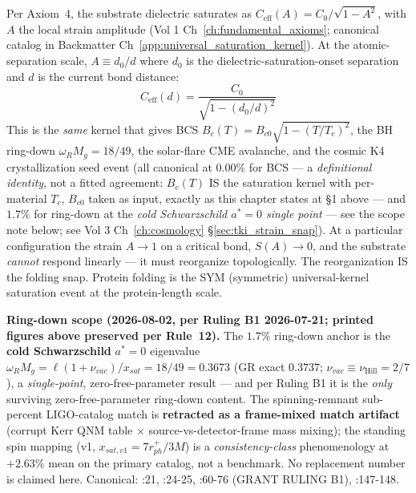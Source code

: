Per Axiom~4, the substrate dielectric saturates as $C_{\text{eff}}(A) = C_0 / \sqrt{1 - A^2}$, with $A$ the local strain amplitude (Vol 1 Ch~\ref{ch:fundamental_axioms}; canonical catalog in Backmatter Ch~\ref{app:universal_saturation_kernel}). At the atomic-separation scale, $A \equiv d_0/d$ where $d_0$ is the dielectric-saturation-onset separation and $d$ is the current bond distance:
\begin{equation}
    C_{\text{eff}}(d) = \frac{C_0}{\sqrt{1 - (d_0/d)^2}}
    \label{eq:protein_saturation_kernel}
\end{equation}
This is the \emph{same} kernel that gives BCS $B_c(T) = B_{c0}\sqrt{1-(T/T_c)^2}$, the BH ring-down $\omega_R M_g = 18/49$, the solar-flare CME avalanche, and the cosmic K4 crystallization seed event (all canonical at $0.00\%$ for BCS --- a \emph{definitional identity}, not a fitted agreement: $B_c(T)$ IS the saturation kernel with per-material $T_c$, $B_{c0}$ taken as input, exactly as this chapter states at \S1 above --- and $1.7\%$ for ring-down at the \emph{cold Schwarzschild $a^{*} = 0$ single point} --- see the scope note below; see Vol 3 Ch~\ref{ch:cosmology} \S\ref{sec:tki_strain_snap}). At a particular configuration the strain $A \to 1$ on a critical bond, $S(A) \to 0$, and the substrate \emph{cannot} respond linearly --- it must reorganize topologically. The reorganization IS the folding snap. Protein folding is the SYM (symmetric) universal-kernel saturation event at the protein-length scale.

\noindent\textbf{Ring-down scope (2026-08-02, per Ruling B1 2026-07-21; printed figures above preserved per Rule~12).} The $1.7\%$ ring-down anchor is the \textbf{cold Schwarzschild} $a^{*} = 0$ eigenvalue $\omega_R M_g = \ell(1+\nu_{vac})/x_{sat} = 18/49 = 0.3673$ (GR exact $0.3737$; $\nu_{vac} \equiv \nu_\text{Hill} = 2/7$), a \emph{single-point}, zero-free-parameter result --- and per Ruling B1 it is the \emph{only} surviving zero-free-parameter ring-down content. The spinning-remnant sub-percent LIGO-catalog match is \textbf{retracted as a frame-mixed match artifact} (corrupt Kerr QNM table $\times$ source-vs-detector-frame mass mixing); the standing spin mapping (v1, $x_{sat,v1} = 7r_{ph}^{+}/3M$) is a \emph{consistency-class} phenomenology at $+2.63\%$ mean on the primary catalog, not a benchmark. No replacement number is claimed here. Canonical: :21, :24-25, :60-76 (GRANT RULING B1), :147-148.

